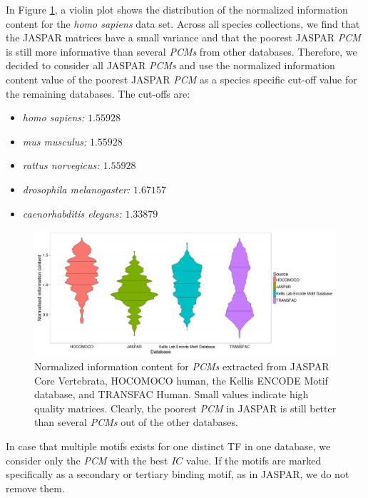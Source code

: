 \documentclass{article}
\begin{document}
In Figure \ref{IC-Content}, a violin plot shows the distribution of the normalized information content for the \textit{homo sapiens} data set. 
Across all species collections, we find that the JASPAR matrices have a small variance and that the poorest JASPAR \textit{PCM} 
is still more informative than several \textit{PCMs} from other databases.
Therefore, we decided to consider all JASPAR \textit{PCMs} and use the normalized information content value of the poorest JASPAR \textit{PCM} as a species specific cut-off value for the remaining databases. The cut-offs are:
\begin{itemize}
\item \textit{homo sapiens: } $1.55928$
\item \textit{mus musculus: } $1.55928$
\item \textit{rattus norvegicus: $1.55928$ }
\item \textit{drosophila melanogaster: $1.67157$}
\item \textit{caenorhabditis elegans: $1.33879$}
\end{itemize}
\begin{figure}[h!]
\begin{center}
\includegraphics[width=\textwidth]{Information_Content_Violin_Plot.png}
\end{center}
\caption{Normalized information content for \textit{PCMs} extracted from JASPAR Core Vertebrata, HOCOMOCO human, the Kellis ENCODE Motif database, and TRANSFAC Human. 
Small values indicate high quality matrices. Clearly, the poorest \textit{PCM} in JASPAR is still better than several \textit{PCMs} out of the other databases.}
\label{IC-Content}
\end{figure}
In case that multiple motifs exists for one distinct TF in one database, we consider only the \textit{PCM} with the best $IC$ value. 
If the motifs are marked specifically as a secondary or tertiary binding motif, as in JASPAR, we do not remove them. 
\end{document}
